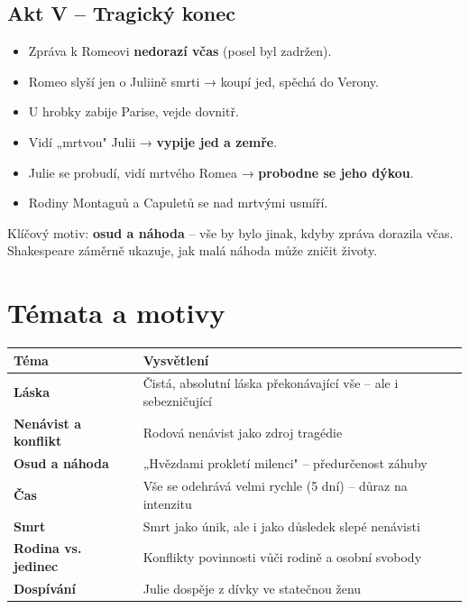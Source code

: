 \documentclass[12pt,a4paper]{article}
\begin{document}
\subsection{Akt V – Tragický konec}
\begin{itemize}[leftmargin=1.5em]
  \item Zpráva k Romeovi \textbf{nedorazí včas} (posel byl zadržen).
  \item Romeo slyší jen o Juliině smrti → koupí jed, spěchá do Verony.
  \item U hrobky zabije Parise, vejde dovnitř.
  \item Vidí „mrtvou" Julii → \textbf{vypije jed a zemře}.
  \item Julie se probudí, vidí mrtvého Romea → \textbf{probodne se jeho dýkou}.
  \item Rodiny Montaguů a Capuletů se nad mrtvými usmíří.
\end{itemize}

\begin{tip}
  Klíčový motiv: \textbf{osud a náhoda} – vše by bylo jinak, kdyby zpráva dorazila včas.
  Shakespeare záměrně ukazuje, jak malá náhoda může zničit životy.
\end{tip}

\section{Témata a motivy}

\begin{tabular}{>{\bfseries}p{4cm} p{9cm}}
  \toprule
  Téma & Vysvětlení \\
  \midrule
  Láska & Čistá, absolutní láska překonávající vše – ale i sebezničující \\
  Nenávist a konflikt & Rodová nenávist jako zdroj tragédie \\
  Osud a náhoda & „Hvězdami prokletí milenci" – předurčenost záhuby \\
  Čas & Vše se odehrává velmi rychle (5 dní) – důraz na intenzitu \\
  Smrt & Smrt jako únik, ale i jako důsledek slepé nenávisti \\
  Rodina vs. jedinec & Konflikty povinnosti vůči rodině a osobní svobody \\
  Dospívání & Julie dospěje z dívky ve statečnou ženu \\
  \bottomrule
\end{tabular}
\end{document}
